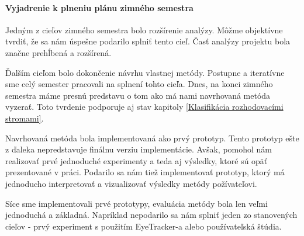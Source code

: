 \paragraph{Vyjadrenie k plneniu plánu zimného semestra} Jedným z cieľov zimného semestra bolo rozšírenie analýzy. Môžme objektívne tvrdiť, že sa nám úspešne podarilo splniť tento cieľ. Časť analýzy projektu bola značne prehĺbená a rozšírená.
\par
Ďalším cieľom bolo dokončenie návrhu vlastnej metódy. Postupne a iteratívne sme celý semester pracovali na splnení tohto cieľa. Dnes, na konci zimného semestra máme presnú predstavu o tom ako má nami navrhovaná metóda vyzerať. Toto tvrdenie podporuje aj stav kapitoly \ref{Klasifikácia rozhodovacími stromami}.
\par
Navrhovaná metóda bola implementovaná ako prvý prototyp. Tento prototyp ešte z ďaleka nepredstavuje finálnu verziu implementácie. Avšak, pomohol nám realizovať prvé jednoduché experimenty a teda aj výsledky, ktoré sú opäť prezentované v práci. Podarilo sa nám tiež implementovať prototyp, ktorý má jednoducho interpretovať a vizualizovať výsledky metódy požívateľovi.
\par
Síce sme implementovali prvé prototypy, evaluácia metódy bola len veľmi jednoduchá a základná. Napríklad nepodarilo sa nám splniť jeden zo stanovených cieľov - prvý experiment s použitím EyeTracker-a alebo používateľská štúdia.

\newpage

